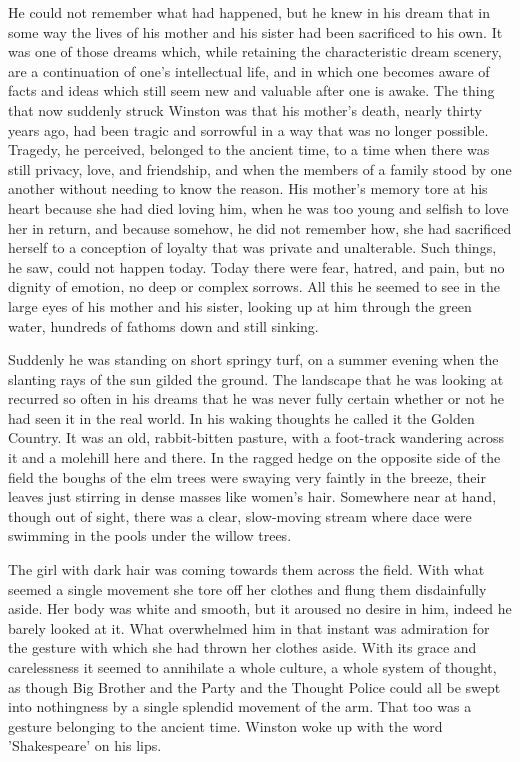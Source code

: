 \documentclass{article}
\begin{document}
He could not remember what had happened, but he knew in his dream that in
some way the lives of his mother and his sister had been sacrificed to his
own. It was one of those dreams which, while retaining the characteristic
dream scenery, are a continuation of one's intellectual life, and in which
one becomes aware of facts and ideas which still seem new and valuable
after one is awake. The thing that now suddenly struck Winston was that his
mother's death, nearly thirty years ago, had been tragic and sorrowful in
a way that was no longer possible. Tragedy, he perceived, belonged to the
ancient time, to a time when there was still privacy, love, and friendship,
and when the members of a family stood by one another without needing to
know the reason. His mother's memory tore at his heart because she had died
loving him, when he was too young and selfish to love her in return, and
because somehow, he did not remember how, she had sacrificed herself to a
conception of loyalty that was private and unalterable. Such things, he
saw, could not happen today. Today there were fear, hatred, and pain, but
no dignity of emotion, no deep or complex sorrows. All this he seemed to
see in the large eyes of his mother and his sister, looking up at him
through the green water, hundreds of fathoms down and still sinking.

Suddenly he was standing on short springy turf, on a summer evening when
the slanting rays of the sun gilded the ground. The landscape that he was
looking at recurred so often in his dreams that he was never fully certain
whether or not he had seen it in the real world. In his waking thoughts he
called it the Golden Country. It was an old, rabbit-bitten pasture, with a
foot-track wandering across it and a molehill here and there. In the ragged
hedge on the opposite side of the field the boughs of the elm trees were
swaying very faintly in the breeze, their leaves just stirring in dense
masses like women's hair. Somewhere near at hand, though out of sight,
there was a clear, slow-moving stream where dace were swimming in the
pools under the willow trees.

The girl with dark hair was coming towards them across the field. With
what seemed a single movement she tore off her clothes and flung them
disdainfully aside. Her body was white and smooth, but it aroused no desire
in him, indeed he barely looked at it. What overwhelmed him in that instant
was admiration for the gesture with which she had thrown her clothes aside.
With its grace and carelessness it seemed to annihilate a whole culture,
a whole system of thought, as though Big Brother and the Party and the
Thought Police could all be swept into nothingness by a single splendid
movement of the arm. That too was a gesture belonging to the ancient time.
Winston woke up with the word 'Shakespeare' on his lips.
\end{document}
